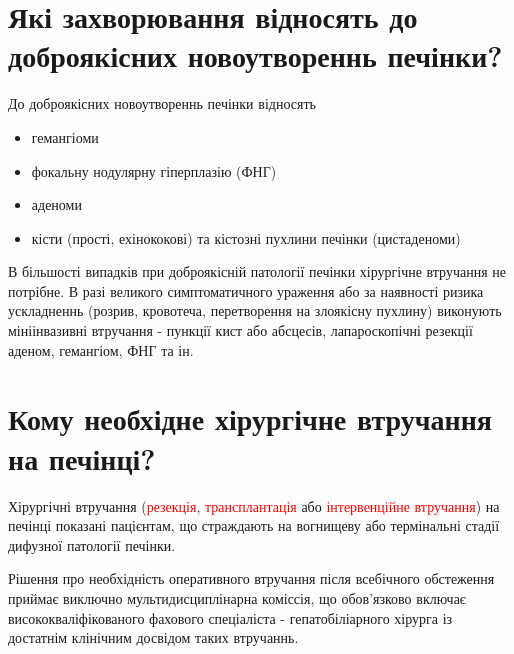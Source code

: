 \newpage
\section{Які захворювання відносять до доброякісних новоутвореннь печінки?}

До доброякісних новоутвореннь печінки відносять 
\begin{itemize}
    \item гемангіоми
    \item фокальну нодулярну гіперплазію (ФНГ)
    \item аденоми
    \item кісти (прості, ехінококові) та кістозні пухлини печінки (цистаденоми)
\end{itemize}

В більшості випадків при доброякісній патології печінки хірургічне втручання не потрібне. В разі великого симптоматичного ураження або за наявності ризика ускладненнь (розрив, кровотеча, перетворення на злоякісну пухлину) виконують мініінвазивні втручання - пункції кист або абсцесів, лапароскопічні резекції аденом, гемангіом, ФНГ та ін.  


\section{Кому необхідне хірургічне втручання на печінці?}

Хірургічні втручання (\textcolor{red}{резекція}, \textcolor{red}{трансплантація}  або \textcolor{red}{інтервенційне втручання}) на печінці показані пацієнтам, що страждають на вогнищеву або термінальні стадії дифузної патології печінки. 

Рішення про необхідність оперативного втручання після всебічного обстеження приймає виключно мультидисциплінарна коміссія, що обов’язково включає висококваліфікованого фахового спеціаліста - гепатобіліарного хірурга із достатнім клінічним досвідом таких втручаннь. 